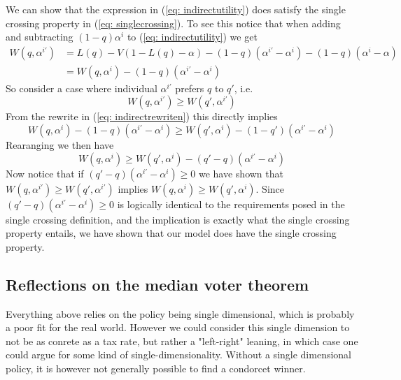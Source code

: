 We can show that the expression in (\ref{eq: indirectutility}) does satisfy the single crossing property in (\ref{eq: singlecrossing}). To see this notice that when adding and subtracting $(1-q)\alpha^i$ to (\ref{eq: indirectutility}) we get 
\begin{equation} \label{eq: indirectrewriten}
  \begin{split}
    W(q, \alpha^{i'}) &= L(q) - V(1-L(q)-\alpha) -(1-q)(\alpha^{i'} - \alpha^i) - (1-q)(\alpha^i - \alpha) \\ 
  &= W(q, \alpha^i) - (1-q)(\alpha^{i'} - \alpha^i)    
  \end{split}
\end{equation}
So consider a case where individual $\alpha^{i'}$ prefers $q$ to $q'$, i.e.
\begin{equation}
  W(q, \alpha^{i'}) \geq W(q', \alpha^{i'})
\end{equation}
From the rewrite in (\ref{eq: indirectrewriten}) this directly implies 
\begin{equation}
  W(q, \alpha^{i}) - (1-q)(\alpha^{i'}- \alpha^i) \geq 
  W(q', \alpha^{i}) - (1-q')(\alpha^{i'}- \alpha^i)
\end{equation}
Rearanging we then have 
\begin{equation}
  W(q, \alpha^i) \geq W(q', \alpha^i) - (q'-q)(\alpha^{i'} - \alpha^i)
\end{equation}
Now notice that if $(q'-q)(\alpha^{i'} - \alpha^i) \geq 0$ we have shown that $W(q, \alpha^{i'}) \geq W(q', \alpha^{i'})$ implies $W(q, \alpha^i) \geq W(q', \alpha^i)$. Since $(q'-q)(\alpha^{i'} - \alpha^i) \geq 0$ is logically identical to the requirements posed in the single crossing definition, and the implication is exactly what the single crossing property entails, we have shown that our model does have the single crossing property. 

\subsection{Reflections on the median voter theorem}
Everything above relies on the policy being single dimensional, which is probably a poor fit for the real world. However we could consider this single dimension to not be as conrete as a tax rate, but rather a "left-right" leaning, in which case one could argue for some kind of single-dimensionality. Without a single dimensional policy, it is however not generally possible to find a condorcet winner. 